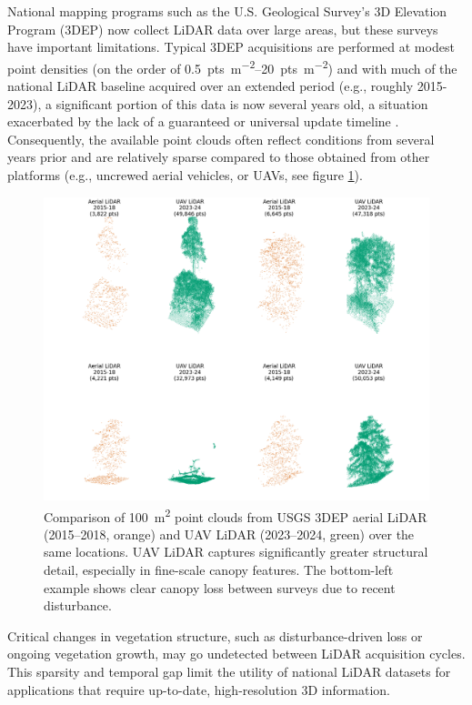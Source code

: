 \documentclass[preprints,article,accept,pdftex,moreauthors]{Definitions/mdpi}
\begin{document}
National mapping programs such as the U.S. Geological Survey's 3D Elevation Program (3DEP) now collect LiDAR data over large areas, but these surveys have important limitations. Typical 3DEP acquisitions are performed at modest point densities (on the order of \qtyrange{0.5}{20}{pts\per\square\meter}) \cite{wu2016evaluating} and with much of the national LiDAR baseline acquired over an extended period (e.g., roughly 2015-2023), a significant portion of this data is now several years old, a situation exacerbated by the lack of a guaranteed or universal update timeline \cite{usgs_what_2019}. Consequently, the available point clouds often reflect conditions from several years prior and are relatively sparse compared to those obtained from other platforms (e.g., uncrewed aerial vehicles, or UAVs, see figure \ref{fig:als_v_uav}).
\begin{figure}[!b]
    \centering
    \includegraphics[trim={15mm 5mm 15mm 0mm},width=1\linewidth]{manuscript//figures/als_vs_uavls.png}
    \caption{Comparison of \SI{100}{\square\meter} point clouds from USGS 3DEP aerial LiDAR (2015--2018, orange) and UAV LiDAR (2023--2024, green) over the same locations. UAV LiDAR captures significantly greater structural detail, especially in fine-scale canopy features. The bottom-left example shows clear canopy loss between surveys due to recent disturbance.}
    \label{fig:als_v_uav}
\end{figure}
Critical changes in vegetation structure, such as disturbance-driven loss or ongoing vegetation growth, may go undetected between LiDAR acquisition cycles. This sparsity and temporal gap limit the utility of national LiDAR datasets for applications that require up-to-date, high-resolution 3D information.
\end{document}
